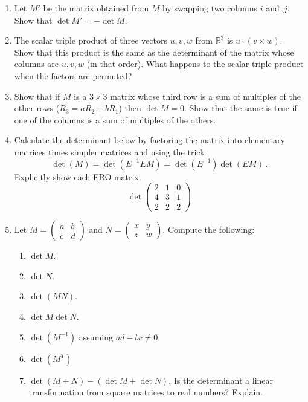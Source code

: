 \begin{enumerate}
\item Let $M'$ be the matrix obtained from $M$ by swapping two columns $i$ and~$j$. Show that $\det M'=-\det M $.

\item The scalar triple product of three vectors $u,v,w$ from $\mathbb{R}^3$ is $u\cdot(v\times w)$. Show that this product is the same as the determinant of the matrix whose columns are $u,v,w$ (in that order). What happens to the scalar triple product when the factors are permuted? 

\item Show that if $M$ is a $3\times 3$ matrix whose third row is a sum of multiples of the other rows ($R_3=aR_2+bR_1$) then $\det M=0$. Show that the same is true if one of the columns is a sum of multiples of the others. 




\item Calculate the determinant below by factoring the matrix into 
elementary matrices times simpler matrices and using the trick
\[\det (M)= \det ( E^{-1}EM)=
\det (E^{-1})  \det (EM)\, .\] Explicitly show each ERO matrix.
\[
\det
\begin{pmatrix}
2 & 1 &0\\
4 & 3&1\\
2&2&2
\end{pmatrix}
\]


\item Let $M=\begin{pmatrix}
a & b \\
c & d
\end{pmatrix}$ and $N=\begin{pmatrix}
x & y \\
z & w
\end{pmatrix}$.  Compute the following:
\begin{enumerate}
\item $\det M$.
\item $\det N$.
\item $\det (MN)$.
\item $\det M \det N$.
\item $\det (M^{-1})$ assuming $ad-bc\neq 0$.
\item $\det (M^T)$
\item $\det (M+N) - (\det M + \det N)$. Is the determinant a linear transformation from square matrices to real numbers? Explain.
\end{enumerate}


\end{enumerate}
